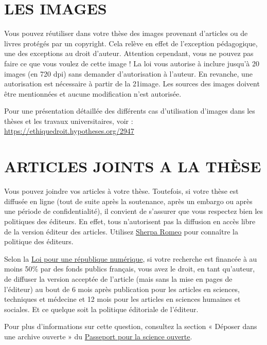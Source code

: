 \documentclass[french,12pt,a4paper]{book}
\begin{document}
\section{LES IMAGES}
Vous pouvez réutiliser dans votre thèse des images provenant d’articles ou de livres protégés par un copyright. Cela relève en effet de l’exception pédagogique, une des exceptions au droit d’auteur. Attention cependant, vous ne pouvez pas faire ce que vous voulez de cette image ! La loi vous autorise à inclure jusqu’à 20 images (en 720 dpi) sans demander d’autorisation à l’auteur. En revanche, une autorisation est nécessaire à partir de la 21\ieme image. Les sources des images doivent être mentionnées et aucune modification n’est autorisée.\\ \par
Pour une présentation détaillée des différents cas d’utilisation d’images dans les thèses et les travaux universitaires, voir : \url{https://ethiquedroit.hypotheses.org/2947}
\section{ARTICLES JOINTS A LA THÈSE}
Vous pouvez joindre vos articles à votre thèse. Toutefois, si votre thèse est diffusée en ligne (tout de suite après la soutenance, après un embargo ou après une période de confidentialité), il convient de s’assurer que vous respectez bien les politiques des éditeurs. En effet, tous n’autorisent pas la diffusion en accès libre de la version éditeur des articles. Utilisez \href{https://v2.sherpa.ac.uk/romeo/}{Sherpa Romeo} pour connaître la politique des éditeurs. \\ \par
Selon la \href{https://www.legifrance.gouv.fr/dossierlegislatif/JORFDOLE000031589829/}{Loi pour une république numérique}, si votre recherche est financée à au moins 50\% par des fonds publics français, vous avez le droit, en tant qu’auteur, de diffuser la version acceptée de l’article (mais sans la mise en pages de l’éditeur) au bout de 6 mois après publication pour les articles en sciences, techniques et médecine et 12 mois pour les articles en sciences humaines et sociales. Et ce quelque soit la politique éditoriale de l’éditeur.\\ \par
Pour plus d’informations sur cette question, consultez la section « Déposer dans une archive ouverte » du \href{https://www.ouvrirlascience.fr/wp-content/uploads/2021/09/Passeport-pour-la-science-ouverte-Guide-a-lusage-des-doctorants_10-09-2021_WEB_FR.pdf}{Passeport pour la science ouverte}.
\end{document}
